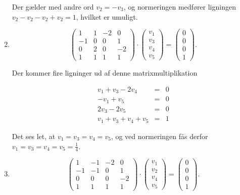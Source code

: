 \begin{enumerate}
     Der g{\ae}lder med andre ord $v_2 = -v_3$, og normeringen  
     medf{\o}rer ligningen $v_2-v_2-v_2+v_2 = 1$, hvilket er umuligt.
   \item
     \begin{equation}
       \left(
       \begin{array}{cccc}
         1 & 1 & -2 & 0 \\
         -1 & 0 & 0 & 1 \\
         0 & 2 & 0 & -2 \\
         1 & 1 & 1 & 1
       \end{array}
       \right) \cdot
       \left(
       \begin{array}{c}
         v_1 \\
         v_3 \\
         v_4 \\
         v_5
       \end{array}
       \right) =
       \left(
       \begin{array}{c}
         0 \\
         0 \\
         0 \\
         1
       \end{array}
       \right).
     \end{equation}
     
     Der kommer fire ligninger ud af denne matrixmultiplikation
     
     \begin{eqnarray*}
       v_1 + v_3 - 2v_4 &=& 0 \\
       -v_1 + v_5 &=& 0 \\
       2v_3 - 2v_5 &=& 0 \\
       v_1 + v_3 + v_4 + v_5 &=& 1
     \end{eqnarray*}
     
     Det ses let, at $v_1=v_3=v_4=v_5$, og ved normeringen f{\aa}s
     derfor $v_1=v_3=v_4=v_5 = \frac{1}{4}$.

   \item
     \begin{equation}
       \left(
       \begin{array}{cccc}
         1 & -1 & -2 & 0 \\
         -1 & -1 & 0 & 1 \\
         0 & 0 & 0 & -2 \\
         1 & 1 & 1 & 1
       \end{array}
       \right) \cdot
       \left(
       \begin{array}{c}
         v_1 \\
         v_2 \\
         v_4 \\
         v_5
       \end{array}
       \right) = 
       \left(
       \begin{array}{c}
         0 \\
         0 \\
         0 \\
         1
       \end{array}
       \right).
     \end{equation}


\end{enumerate}
